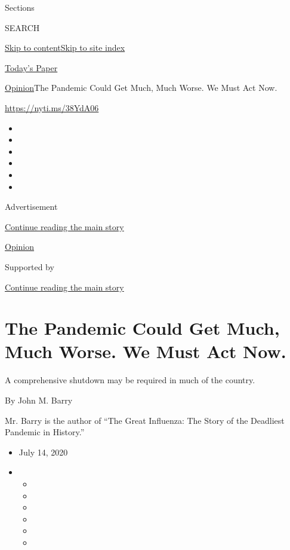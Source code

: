 Sections

SEARCH

\protect\hyperlink{site-content}{Skip to
content}\protect\hyperlink{site-index}{Skip to site index}

\href{https://myaccount.nytimes.com/auth/login?response_type=cookie\&client_id=vi}{}

\href{https://www.nytimes.com/section/todayspaper}{Today's Paper}

\href{/section/opinion}{Opinion}\textbar{}The Pandemic Could Get Much,
Much Worse. We Must Act Now.

\href{https://nyti.ms/38YdA06}{https://nyti.ms/38YdA06}

\begin{itemize}
\item
\item
\item
\item
\item
\item
\end{itemize}

Advertisement

\protect\hyperlink{after-top}{Continue reading the main story}

\href{/section/opinion}{Opinion}

Supported by

\protect\hyperlink{after-sponsor}{Continue reading the main story}

\hypertarget{the-pandemic-could-get-much-much-worse-we-must-act-now}{%
\section{The Pandemic Could Get Much, Much Worse. We Must Act
Now.}\label{the-pandemic-could-get-much-much-worse-we-must-act-now}}

A comprehensive shutdown may be required in much of the country.

By John M. Barry

Mr. Barry is the author of ``The Great Influenza: The Story of the
Deadliest Pandemic in History.''

\begin{itemize}
\item
  July 14, 2020
\item
  \begin{itemize}
  \item
  \item
  \item
  \item
  \item
  \item
  \end{itemize}
\end{itemize}


